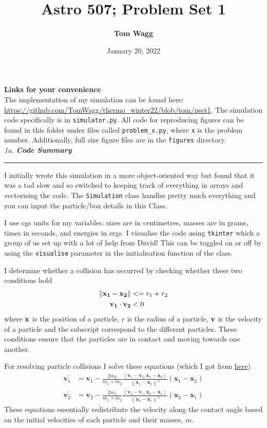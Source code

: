 \documentclass[12pt, letterpaper, twoside]{article}
\title{Astro 507; Problem Set 1}
\author{\textbf{Tom Wagg}}
\date{January 20, 2022}
\newcommand{\question}[1]{{\noindent \it #1}}
\newcommand{\answer}[1]{
    \par\noindent\rule{\textwidth}{0.4pt}#1\vspace{0.5cm}
}
\begin{document}
\maketitle

\noindent\textbf{Links for your convenience}\\
The implementation of my simulation can be found here: \url{https://github.com/TomWagg/thermo_winter22/blob/tom/pset1}. The simulation code specifically is in \texttt{simulator.py}. All code for reproducing figures can be found in this folder under files called \texttt{problem\_x.py}, where \texttt{x} is the problem number. Additionally, full size figure files are in the \texttt{figures} directory.\\

\question{1a. \textbf{Code Summary}}
\answer{
    I initially wrote this simulation in a more object-oriented way but found that it was a tad slow and so switched to keeping track of everything in arrays and vectorising the code. The \texttt{Simulation} class handles pretty much everything and you can input the particle/box details in this Class.
    
    I use cgs units for my variables: sizes are in centimetres, masses are in grams, times in seconds, and energies in ergs. I visualise the code using \texttt{tkinter} which a group of us set up with a lot of help from David! This can be toggled on or off by using the \texttt{visualise} parameter in the initialisation function of the class.
    
    I determine whether a collision has occurred by checking whether these two conditions hold
    \begin{align}
        \norm{\vb{x_1} - \vb{x_2}} &<= r_1 + r_2 \\
        \vb{v_1} \cdot \vb{v_2} &< 0
    \end{align}
    where $\vb{x}$ is the position of a particle, $r$ is the radius of a particle, $\vb{v}$ is the velocity of a particle and the subscript correspond to the different particles. These conditions ensure that the particles are in contact and moving towards one another.
    
    For resolving particle collisions I solve these equations (which I got from \href{https://en.wikipedia.org/wiki/Elastic_collision\#Two-dimensional_collision_with_two_moving_objects}{here})
    \begin{align}
        \mathbf{v}_{1}^{\prime} &= \mathbf{v}_{1}-\frac{2 m_{2}}{m_{1}+m_{2}} \frac{\left\langle\mathbf{v}_{1}-\mathbf{v}_{2}, \mathbf{x}_{1}-\mathbf{x}_{2}\right\rangle}{\left\|\mathbf{x}_{1}-\mathbf{x}_{2}\right\|^{2}}\left(\mathbf{x}_{1}-\mathbf{x}_{2}\right) \\
        \mathbf{v}_{2}^{\prime} &= \mathbf{v}_{2}-\frac{2 m_{1}}{m_{1}+m_{2}} \frac{\left\langle\mathbf{v}_{2}-\mathbf{v}_{1}, \mathbf{x}_{2}-\mathbf{x}_{1}\right\rangle}{\left\|\mathbf{x}_{2}-\mathbf{x}_{1}\right\|^{2}}\left(\mathbf{x}_{2}-\mathbf{x}_{1}\right)
    \end{align}
    These equations essentially redistribute the velocity along the contact angle based on the initial velocities of each particle and their masses, $m$.
    
}
\end{document}
